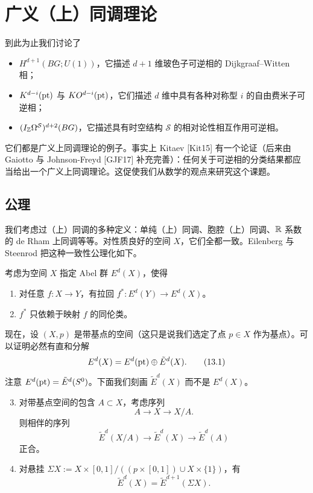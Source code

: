 
\chapter{广义（上）同调理论}

到此为止我们讨论了
\begin{itemize}
  \item $H^{d+1}(BG;U(1))$，它描述 $d+1$ 维玻色子可逆相的 Dijkgraaf--Witten 相；
  \item $K^{d-i}(\mathrm{pt})$ 与 $KO^{d-i}(\mathrm{pt})$，它们描述 $d$ 维中具有各种对称型 $i$ 的自由费米子可逆相；
  \item $(I_{\mathbb{Z}}\Omega^{\mathcal S})^{d+2}(BG)$，它描述具有时空结构 $\mathcal S$ 的相对论性相互作用可逆相。
\end{itemize}
它们都是广义上同调理论的例子。事实上 Kitaev [Kit15] 有一个论证（后来由 Gaiotto 与 Johnson-Freyd [GJF17] 补充完善）：任何关于可逆相的分类结果都应当给出一个广义上同调理论。这促使我们从数学的观点来研究这个课题。

\section{公理}

我们考虑过（上）同调的多种定义：单纯（上）同调、胞腔（上）同调、$\mathbb{R}$ 系数的 de Rham 上同调等等。对性质良好的空间 $X$，它们全都一致。Eilenberg 与 Steenrod 把这种一致性公理化如下。

考虑为空间 $X$ 指定 Abel 群 $E^d(X)$，使得
\begin{enumerate}
  \item 对任意 $f:X\to Y$，有拉回 $f^*:E^d(Y)\to E^d(X)$。
  \item $f^*$ 只依赖于映射 $f$ 的同伦类。
\end{enumerate}
现在，设 $(X,p)$ 是带基点的空间（这只是说我们选定了点 $p\in X$ 作为基点）。可以证明必然有直和分解
\begin{equation}
E^d(X)=E^d(\mathrm{pt})\oplus\tilde E^d(X). \tag{13.1}
\end{equation}
注意 $E^d(\mathrm{pt})=\tilde E^d(S^0)$。下面我们刻画 $\tilde E^d(X)$ 而不是 $E^d(X)$。
\begin{enumerate}
  \setcounter{enumi}{2}
  \item 对带基点空间的包含 $A\subset X$，考虑序列
\begin{equation}
A\to X\to X/A. \tag{13.2}
\end{equation}
则相伴的序列
\begin{equation}
\tilde E^d(X/A)\to\tilde E^d(X)\to\tilde E^d(A) \tag{13.3}
\end{equation}
正合。
  \item 对悬挂 $\Sigma X:=X\times[0,1]/((p\times[0,1])\cup X\times\{1\})$，有
\begin{equation}
\tilde E^d(X)=\tilde E^{d+1}(\Sigma X). \tag{13.4}
\end{equation}
\end{enumerate}

